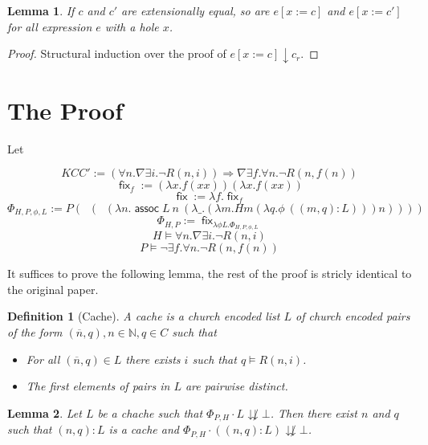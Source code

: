\documentclass{article}
\newtheorem{definition}{Definition}
\newtheorem{lemma}{Lemma}
\DeclareMathOperator{\assoc}{\mathsf{assoc}}
\DeclareMathOperator{\fix}{\mathsf{fix}}
\DeclareMathOperator{\introexists}{\mathsf{intro}_\exists}
\DeclareMathOperator{\introforall}{\mathsf{intro}_\forall}
\newcommand{\N}{\mathbb{N}}
\begin{document}
\begin{lemma}\label{extcongr}
    If $c$ and $c'$ are extensionally equal, so are $e[x := c]$ and $e[x := c']$ for all expression $e$ with a hole $x$.
\end{lemma}
\begin{proof}
    Structural induction over the proof of $e[x := c] \downarrow c_r$.
\end{proof}

\section{The Proof}

Let

\[ KCC' := (\forall n. \nabla \exists i. \neg R(n, i)) \Rightarrow \nabla \exists f. \forall n. \neg R(n, f(n)) \]
\[ \fix_f := (\lambda x. f (x x)) (\lambda x. f (x x)) \]
\[ \fix := \lambda f. \fix_f \]
\[ \Phi_{H, P, \phi, L} := P (\introexists (\introforall (\lambda n. \assoc L\ n\ (\lambda \_. (\lambda m. H m (\lambda q. \phi\ ((m, q):L))) n)))) \]
\[ \Phi_{H, P} := \fix_{\lambda \phi L. \Phi_{H, P, \phi, L}} \]
\[H \models \forall n. \nabla \exists i. \neg R(n, i)\]
\[P \models \neg \exists f. \forall n. \neg R(n, f(n))\]

It suffices to prove the following lemma, the rest of the proof is stricly identical to the original paper.

\begin{definition}[Cache]
    A cache is a church encoded list $L$ of church encoded pairs of the form $(\overline{n}, q), n \in \N, q \in C$ such that
    \begin{itemize}
        \item For all $(\overline{n}, q) \in L$ there exists $i$ such that $q \models R(n, i)$.
        \item The first elements of pairs in $L$ are pairwise distinct.
    \end{itemize}
\end{definition}

\begin{lemma}\label{addlist}
    Let $L$ be a chache such that $\Phi_{P, H} \cdot L \not\downdownarrows \bot$. Then there exist $n$ and $q$ such that $(n, q):L$ is a cache and $\Phi_{P, H} \cdot ((n, q):L) \not\downdownarrows \bot$.
\end{lemma}
\end{document}
